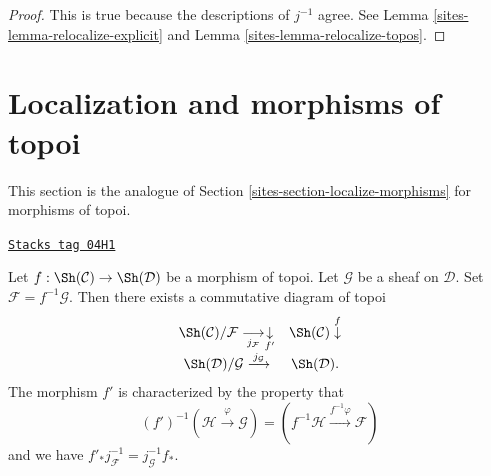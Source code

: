 \begin{proof}

This is true because the descriptions of $j^{-1}$ agree.
See
Lemma \ref{sites-lemma-relocalize-explicit}
and
Lemma \ref{sites-lemma-relocalize-topos}.
\end{proof}

\section{Localization and morphisms of topoi}
\label{sites-section-localize-morphisms-topoi}
This section is the analogue of
Section \ref{sites-section-localize-morphisms}
for morphisms of topoi.

\begin{lemma}
\label{sites-lemma-localize-morphism-topoi}
\href{https://stacks.math.columbia.edu/tag/04H1}{\texttt{Stacks tag 04H1}}

Let $f : \Sh(\mathcal{C}) \to \Sh(\mathcal{D})$
be a morphism of topoi. Let $\mathcal{G}$ be a sheaf on $\mathcal{D}$.
Set $\mathcal{F} = f^{-1}\mathcal{G}$. Then there exists
a commutative diagram of topoi
$$
\begin{array}{cc}\Sh(\mathcal{C})/\mathcal{F} \underset{j_\mathcal{F}}{\longrightarrow}\underset{f'}{\downarrow} & \Sh(\mathcal{C}) \overset{f}{\downarrow} \\ \Sh(\mathcal{D})/\mathcal{G} \overset{j_\mathcal{G}}{\longrightarrow} & \Sh(\mathcal{D}).\end{array}
$$
The morphism $f'$ is characterized by the property that
$$
(f')^{-1}(\mathcal{H} \xrightarrow{\varphi} \mathcal{G})
=
(f^{-1}\mathcal{H} \xrightarrow{f^{-1}\varphi} \mathcal{F})
$$
and we have $f'_*j_\mathcal{F}^{-1} = j_\mathcal{G}^{-1}f_*$.
\end{lemma}

